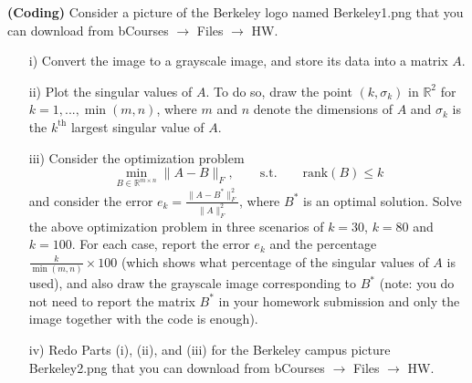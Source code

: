 \begin{homeworkProblem}

    \textbf{(Coding)} Consider a picture of the Berkeley logo named 
    Berkeley1.png that you can download from bCourses $\rightarrow$ Files 
    $\rightarrow$ HW.
    \begin{itemize}
        \item [i)] Convert the image to a grayscale image, and store its data 
        into a matrix $A$.
        \item [ii)] Plot the singular values of $A$. To do so, draw the point 
        $(k,\sigma_k)$ in $\mathbb R^2$ for $k=1,...,\min(m,n)$, where $m$ and 
        $n$ denote the dimensions of $A$ and $\sigma_k$ is the $k^{\text{th}}$ 
        largest singular value of $A$.
        \item [iii)] Consider the optimization problem
        \begin{equation}
            \min_{B\in\mathbb R^{m\times n}}\|A-B\|_F,\qquad \text{s.t.}\qquad 
            \text{rank}(B)\leq k
        \end{equation}
        and consider the error $e_k=\frac{\|A-B^*\|_F^2}{\|A\|_F^2}$, where 
        $B^*$ is an optimal solution. Solve the above optimization problem in 
        three scenarios of $k=30$, $k=80$ and $k=100$. For each case, report 
        the error $e_k$ and the percentage $\frac{k}{\min(m,n)}\times 100$ 
        (which shows what percentage of the singular values of $A$ is used), 
        and also draw the grayscale image corresponding to $B^*$ (note: you do 
        not need to report the matrix $B^*$ in your homework submission and 
        only the image together with the code is enough).

        \item [iv)] Redo Parts (i), (ii), and (iii) for the Berkeley campus 
        picture Berkeley2.png that you can download from bCourses 
        $\rightarrow$ Files $\rightarrow$ HW.
    \end{itemize}

    \begin{solution}
    \end{solution}

\end{homeworkProblem}